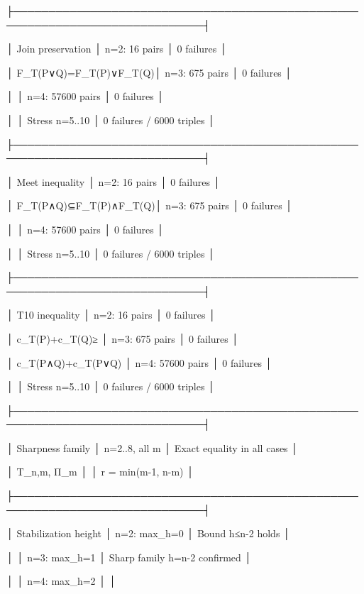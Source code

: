 ├─────────────────────────────────────────────────────────────────────────────┤

│ Join preservation       │ n=2: 16 pairs      │ 0 failures                   │

│ F_T(P∨Q)=F_T(P)∨F_T(Q)│ n=3: 675 pairs     │ 0 failures                   │

│                         │ n=4: 57600 pairs   │ 0 failures                   │

│                         │ Stress n=5..10     │ 0 failures / 6000 triples    │

├─────────────────────────────────────────────────────────────────────────────┤

│ Meet inequality         │ n=2: 16 pairs      │ 0 failures                   │

│ F_T(P∧Q)⊆F_T(P)∧F_T(Q)│ n=3: 675 pairs     │ 0 failures                   │

│                         │ n=4: 57600 pairs   │ 0 failures                   │

│                         │ Stress n=5..10     │ 0 failures / 6000 triples    │

├─────────────────────────────────────────────────────────────────────────────┤

│ T10 inequality          │ n=2: 16 pairs      │ 0 failures                   │

│ c_T(P)+c_T(Q)≥         │ n=3: 675 pairs     │ 0 failures                   │

│ c_T(P∧Q)+c_T(P∨Q)      │ n=4: 57600 pairs   │ 0 failures                   │

│                         │ Stress n=5..10     │ 0 failures / 6000 triples    │

├─────────────────────────────────────────────────────────────────────────────┤

│ Sharpness family        │ n=2..8, all m      │ Exact equality in all cases  │

│ T_{n,m}, Π_m            │                    │ r = min(m-1, n-m)            │

├─────────────────────────────────────────────────────────────────────────────┤

│ Stabilization height    │ n=2: max_h=0       │ Bound h≤n-2 holds            │

│                         │ n=3: max_h=1       │ Sharp family h=n-2 confirmed │

│                         │ n=4: max_h=2       │                              │

